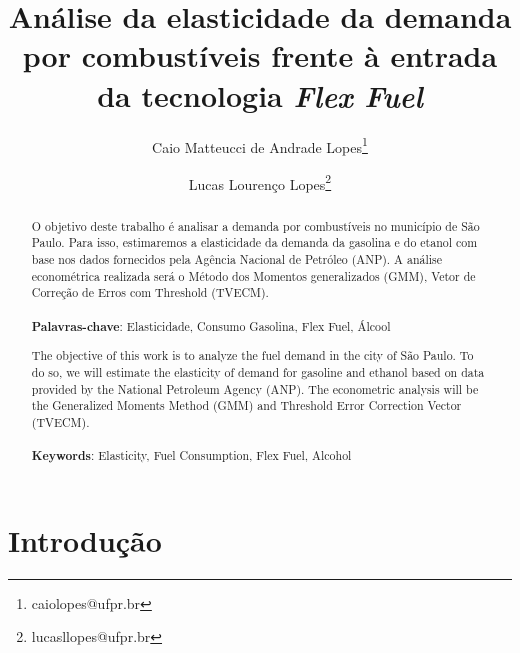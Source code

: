 \documentclass[
	article,			%
	12pt,				%
	oneside,			%
	a4paper,			%
	english,			%
	brazil				%
	]{abntex2}
\date{}
\begin{document}
\title{Análise da elasticidade da demanda por combustíveis frente à entrada da tecnologia \textit{Flex Fuel} }
\author{Caio Matteucci de Andrade Lopes\thanks{caiolopes@ufpr.br} 
    \and Lucas Lourenço Lopes\thanks{lucasllopes@ufpr.br } }
   

\maketitle

\begin{abstract}
O objetivo deste trabalho é analisar a demanda por combustíveis no município de São Paulo. Para isso, estimaremos a elasticidade da demanda da gasolina e do etanol com base nos dados fornecidos pela Agência Nacional de Petróleo (ANP). A análise econométrica realizada será o Método dos Momentos generalizados (GMM), Vetor de Correção de Erros com Threshold (TVECM).      \\ \\
\textbf {Palavras-chave}: Elasticidade, Consumo Gasolina, Flex Fuel, Álcool
\end{abstract}

\begin{abstract}
The objective of this work is to analyze the fuel demand in the city of São Paulo. To do so, we will estimate the elasticity of demand for gasoline and ethanol based on data provided by the National Petroleum Agency (ANP). The econometric analysis will be the Generalized Moments Method (GMM) and Threshold Error Correction Vector (TVECM). \\ \\
\textbf {Keywords}: Elasticity, Fuel Consumption, Flex Fuel, Alcohol
\end{abstract}




\section{Introdução}



\end{document}

